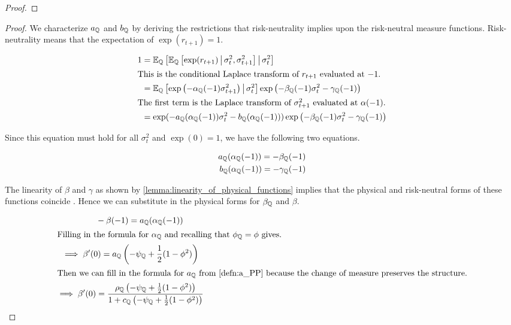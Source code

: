 \documentclass[11pt, letterpaper, twoside, final]{article}
\begin{document}
\begin{appendices}
\begin{proof}
\end{proof}



\physicalMeasureFunctions*

\begin{proof}
We characterize $a_{\mathbb{Q}}$ and $b_{\mathbb{Q}}$ by deriving the restrictions that risk-neutrality implies upon the
risk-neutral measure functions.
Risk-neutrality means that the expectation of $\exp(r_{t+1}) = 1$.

\begin{align}
    1 &= \E_{\QQ}\left[\E_{\QQ}\left[\exp(r_{t+1}) \mvert \sigma_t^2, \sigma^2_{t+1}\right]  \mvert \sigma^2_t
        \right] \\
%
    \intertext{This is the conditional Laplace transform of $r_{t+1}$ evaluated at $-1$.}
%
      \label{eqn:risk_neutral_at_neg_1}
    &= \E_{\QQ}\left[ \exp\left(-\alpha_{\QQ}(-1) \sigma^2_{t+1}\right)  \mvert \sigma^2_t \right]
       \exp\left(-\beta_{\QQ}(-1) \sigma^2_t - \gamma_{\QQ}(-1)\right)   \\
%
    \intertext{The first term is the Laplace transform of $\sigma^2_{t+1}$ evaluated at $\alpha(-1)$.}
%
      &= \exp(-a_{\QQ}(\alpha_{\QQ}(-1)) \sigma^2_t - b_{\QQ}(\alpha_{\QQ}(-1))) \exp\left(-\beta_{\QQ}(-1)
         \sigma^2_t - \gamma_{\QQ}(-1)\right)  
\end{align}

Since this equation must hold for all $\sigma_t^2$ and $\exp(0) = 1$, we have the following two equations.

\begin{align}
    a_{\mathbb{Q}}(\alpha_{\mathbb{Q}}(-1)) = - \beta_{\mathbb{Q}}(-1) \\
    b_{\mathbb{Q}}(\alpha_{\mathbb{Q}}(-1)) = - \gamma_{\mathbb{Q}}(-1) 
\end{align}


The linearity of $\beta$ and $\gamma$ as shown by \cref{lemma:linearity_of_physical_functions} implies that the
physical and risk-neutral forms of these functions coincide \textcite[Proposition 5]{khrapov2016affine}. 
Hence we can substitute in the physical forms for $\beta_{\mathbb{Q}}$ and $\beta$.

\begin{gather}
    \label{eqn:beta_qq_at_minus_one}
    \phantom{\implies}   - \beta(-1) = a_{\QQ}(\alpha_{\QQ}(-1))\\
%
    \intertext{Filling in the formula for $\alpha_{\QQ}$ and recalling that $\phi_{\QQ} = \phi$ gives.}
%
    \implies \beta'(0) = a_{\QQ}\left(-\psi_{\QQ} + \frac{1}{2} (1- \phi^2)\right)  \\
%
    \intertext{Then we can fill in the formula for $a_{\QQ}$ from \cref{defn:a_PP} because the change of measure
    preserves the structure.}
%
    \implies \beta'(0) = \frac{\rho_{\QQ} \left(-\psi_{\QQ} + \frac{1}{2} (1- \phi^2)\right)}{1 + c_{\QQ}
    \left(-\psi_{\QQ} + \frac{1}{2} (1- \phi^2)\right)} 
    \label{eqn:beta_function_QQ}
\end{gather}


\end{proof}
\end{appendices}
\end{document}
